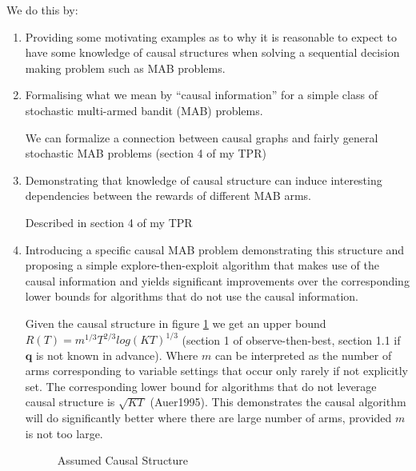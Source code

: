 \documentclass[wcp]{jmlr}
\begin{document}
We do this by:
\begin{enumerate}
	\item Providing some motivating examples as to why it is reasonable to expect to have some knowledge of causal structures when solving a sequential decision making problem such as MAB problems.
	\item Formalising what we mean by ``causal information'' for a simple 	class of stochastic multi-armed bandit (MAB) problems. 
	
	We can formalize a connection between causal graphs and fairly general stochastic MAB problems (section 4 of my TPR)
	
	\item Demonstrating that knowledge of causal structure can induce interesting dependencies between the rewards of different MAB arms.
	
	Described in section 4 of my TPR
	
	\item Introducing a specific causal MAB problem demonstrating this structure and proposing a simple explore-then-exploit algorithm that makes use of the causal information and yields significant improvements over the corresponding lower bounds for algorithms that do not use the causal information.

Given the causal structure in figure \ref{fig:causalStructure} we get an upper bound $R(T) = m^{1/3}T^{2/3}log(KT)^{1/3}$ (section 1 of observe-then-best, section 1.1 if $\boldsymbol{q}$ is not known in advance).  Where $m$ can be interpreted as the number of arms corresponding to variable settings that occur only rarely if not explicitly set. The corresponding lower bound for algorithms that do not leverage causal structure is  $\sqrt{KT}$ (Auer1995). This demonstrates the causal algorithm will do significantly better where there are large number of arms, provided $m$ is not too large.
\begin{figure}[H]
\centering
\caption{Assumed Causal Structure}
\label{fig:causalStructure}
\end{figure}
\end{enumerate}
\end{document}
